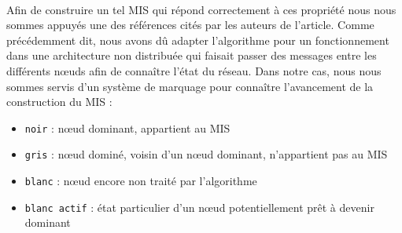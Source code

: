 \paragraph{}
Afin de construire un tel MIS qui répond correctement à ces propriété nous nous sommes appuyés une des références \cite{cardei2002connected} cités par les auteurs de l'article. Comme précédemment dit, nous avons dû adapter l'algorithme pour un fonctionnement dans une architecture non distribuée qui faisait passer des messages entre les différents nœuds afin de connaître l'état du réseau. Dans notre cas, nous nous sommes servis d'un système de marquage pour connaître l'avancement de la construction du MIS :
\begin{itemize}
\item \verb?noir? : nœud dominant, appartient au MIS
\item \verb?gris? : nœud dominé, voisin d'un nœud dominant, n'appartient pas au MIS
\item \verb?blanc? : nœud encore non traité par l'algorithme
\item \verb?blanc actif? : état particulier d'un nœud potentiellement prêt à devenir dominant
\end{itemize}

